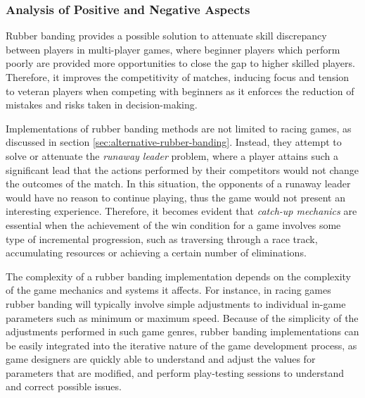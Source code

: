
\subsubsection{Analysis of Positive and Negative Aspects}

Rubber banding provides a possible solution to attenuate skill discrepancy between players in multi-player games, where beginner players which perform poorly are provided more opportunities to close the gap to higher skilled players.  Therefore, it improves the competitivity of matches, inducing focus and tension to veteran players when competing with beginners as it enforces the reduction of mistakes and risks taken in decision-making.

Implementations of rubber banding methods are not limited to racing games, as discussed in section \ref{sec:alternative-rubber-banding}. Instead, they attempt to solve or attenuate the \emph{runaway leader} problem, where a player attains such a significant lead that the actions performed by their competitors would not change the outcomes of the match. In this situation, the opponents of a runaway leader would have no reason to continue playing, thus the game would not present an interesting experience. Therefore, it becomes evident that \emph{catch-up mechanics} are essential when the achievement of the win condition for a game involves some type of incremental progression, such as traversing through a race track, accumulating resources or achieving a certain number of eliminations. 

The complexity of a rubber banding implementation depends on the complexity of the game mechanics and systems it affects. For instance, in racing games rubber banding will typically involve simple adjustments to individual in-game parameters such as minimum or maximum speed. Because of the simplicity of the adjustments performed in such game genres, rubber banding implementations can be easily integrated into the iterative nature of the game development process, as game designers are quickly able to understand and adjust the values for parameters that are modified, and perform play-testing sessions to understand and correct possible issues.

